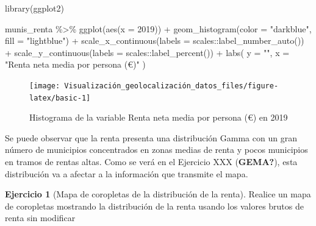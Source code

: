 \documentclass[
]{book}
\newenvironment{Shaded}{\begin{snugshade}}{\end{snugshade}}
\newcommand{\AttributeTok}[1]{\textcolor[rgb]{0.77,0.63,0.00}{#1}}
\newcommand{\FunctionTok}[1]{\textcolor[rgb]{0.00,0.00,0.00}{#1}}
\newcommand{\NormalTok}[1]{#1}
\newcommand{\SpecialCharTok}[1]{\textcolor[rgb]{0.00,0.00,0.00}{#1}}
\newcommand{\StringTok}[1]{\textcolor[rgb]{0.31,0.60,0.02}{#1}}
\theoremstyle{definition}
\theoremstyle{definition}
\theoremstyle{definition}
\newtheorem{exercise}{Ejercicio}[chapter]
\theoremstyle{definition}
\theoremstyle{remark}
\begin{document}
\begin{Shaded}
\begin{Highlighting}[]

\FunctionTok{library}\NormalTok{(ggplot2)}

\NormalTok{munis\_renta }\SpecialCharTok{\%\textgreater{}\%}
  \FunctionTok{ggplot}\NormalTok{(}\FunctionTok{aes}\NormalTok{(}\AttributeTok{x =} \StringTok{\textasciigrave{}}\AttributeTok{2019}\StringTok{\textasciigrave{}}\NormalTok{)) }\SpecialCharTok{+}
  \FunctionTok{geom\_histogram}\NormalTok{(}\AttributeTok{color =} \StringTok{"darkblue"}\NormalTok{, }\AttributeTok{fill =} \StringTok{"lightblue"}\NormalTok{) }\SpecialCharTok{+}
  \FunctionTok{scale\_x\_continuous}\NormalTok{(}\AttributeTok{labels =}\NormalTok{ scales}\SpecialCharTok{::}\FunctionTok{label\_number\_auto}\NormalTok{()) }\SpecialCharTok{+}
  \FunctionTok{scale\_y\_continuous}\NormalTok{(}\AttributeTok{labels =}\NormalTok{ scales}\SpecialCharTok{::}\FunctionTok{label\_percent}\NormalTok{()) }\SpecialCharTok{+}
  \FunctionTok{labs}\NormalTok{(}
    \AttributeTok{y =} \StringTok{""}\NormalTok{,}
    \AttributeTok{x =} \StringTok{"Renta neta media por persona (€)"}
\NormalTok{  )}
\end{Highlighting}
\end{Shaded}

\begin{figure}

{\centering \texttt{[image: Visualización\_geolocalización\_datos\_files/figure-latex/basic-1]} 

}

\caption{Histograma de la variable Renta neta media por persona (€) en 2019}\label{fig:basic}
\end{figure}

Se puede observar que la renta presenta una distribución Gamma con un gran
número de municipios concentrados en zonas medias de renta y pocos municipios en
tramos de rentas altas. Como se verá en el Ejercicio XXX (\textbf{GEMA?}), esta
distribución va a afectar a la información que transmite el mapa.

\begin{exercise}[Mapa de coropletas de la distribución de la renta]
\protect\hypertarget{exr:ex20}{}\label{exr:ex20}Realice un mapa de coropletas mostrando la distribución de la renta usando los
valores brutos de renta sin modificar
\end{exercise}
\end{document}
